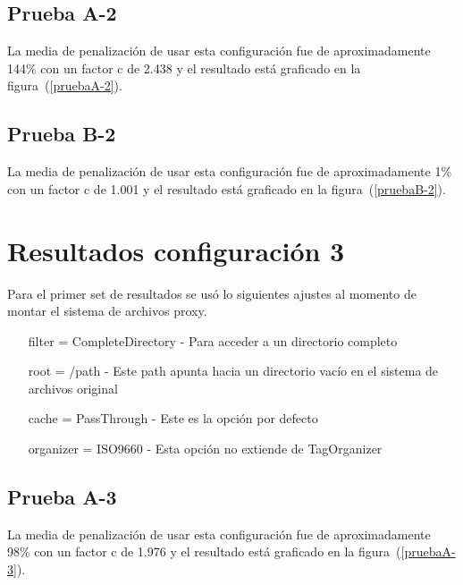 \subsection{Prueba A-2}

La media de penalización de usar esta configuración fue de aproximadamente 144\% con un factor c de 2.438 y el resultado está graficado en la figura~(\ref{pruebaA-2}).


\subsection{Prueba B-2}

La media de penalización de usar esta configuración fue de aproximadamente 1\% con un factor c de 1.001 y el resultado está graficado en la figura~(\ref{pruebaB-2}).


\section{Resultados configuración 3}

Para el primer set de resultados se usó lo siguientes ajustes al momento de montar el sistema de archivos proxy.

\begin{itemize}
\item[filter] = CompleteDirectory - Para acceder a un directorio completo
\item[root] = /path - Este path apunta hacia un directorio vacío en el sistema de archivos original
\item[cache] = PassThrough - Este es la opción por defecto
\item[organizer] = ISO9660 - Esta opción no extiende de TagOrganizer
\end{itemize}

\subsection{Prueba A-3}

La media de penalización de usar esta configuración fue de aproximadamente 98\% con un factor c de 1.976 y el resultado está graficado en la figura~(\ref{pruebaA-3}).

